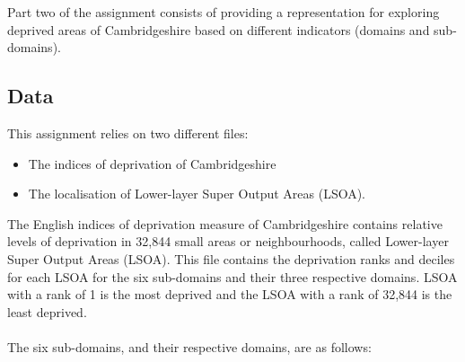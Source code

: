 \documentclass[11pt]{article}
\begin{document}
Part two of the assignment consists of providing a representation for exploring deprived areas of Cambridgeshire based on different indicators (domains and sub-domains).

\subsection*{Data}

This assignment relies on two different files:
\begin{itemize}
    \itemsep0em 
    \item The indices of deprivation of Cambridgeshire
    \item The localisation of Lower-layer Super Output Areas (LSOA).
\end{itemize}

The English indices of deprivation measure of Cambridgeshire contains relative levels of deprivation in 32,844 small areas or neighbourhoods, called Lower-layer Super Output Areas (LSOA). This file contains the deprivation ranks and deciles for each LSOA for the six sub-domains and their three respective domains. LSOA with a rank of 1 is the most deprived and the LSOA with a rank of 32,844 is the least deprived.\\
\\
The six sub-domains, and their respective domains, are as follows:
\end{document}
